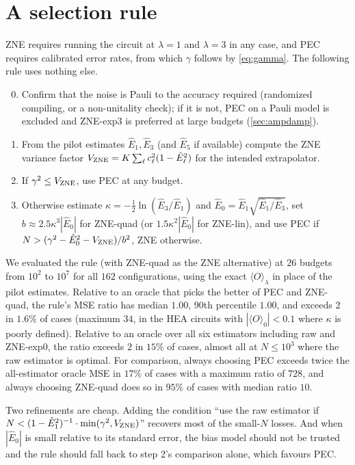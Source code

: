 \documentclass[aps,pra,reprint,amsmath,amssymb,nofootinbib,superscriptaddress]{revtex4-2}
\theoremstyle{remark}
\begin{document}
\section{A selection rule}
\label{sec:rule}

ZNE requires running the circuit at $\lambda=1$ and $\lambda=3$ in any case, and PEC requires calibrated error rates, from which $\gamma$ follows by \cref{eq:gamma}. The following rule uses nothing else.

\begin{enumerate}
\setcounter{enumi}{-1}
\item Confirm that the noise is Pauli to the accuracy required (randomized compiling, or a non-unitality check); if it is not, PEC on a Pauli model is excluded and ZNE-exp3 is preferred at large budgets (\cref{sec:ampdamp}).
\item From the pilot estimates $\hat E_1,\hat E_3$ (and $\hat E_5$ if available) compute the ZNE variance factor $V_{\rm ZNE}=K\sum_\ell c_\ell^2(1-\hat E_\ell^2)$ for the intended extrapolator.
\item If $\gamma^2\le V_{\rm ZNE}$, use PEC at any budget.
\item Otherwise estimate $\kappa=-\tfrac12\ln(\hat E_3/\hat E_1)$ and $\hat E_0=\hat E_1\sqrt{\hat E_1/\hat E_3}$, set $b\approx2.5\kappa^3|\hat E_0|$ for ZNE-quad (or $1.5\kappa^2|\hat E_0|$ for ZNE-lin), and use PEC if $N>(\gamma^2-\hat E_0^2-V_{\rm ZNE})/b^2$, ZNE otherwise.
\end{enumerate}

We evaluated the rule (with ZNE-quad as the ZNE alternative) at $26$ budgets from $10^2$ to $10^7$ for all $162$ configurations, using the exact $\langle O\rangle_\lambda$ in place of the pilot estimates. Relative to an oracle that picks the better of PEC and ZNE-quad, the rule's MSE ratio has median $1.00$, 90th percentile $1.00$, and exceeds $2$ in $1.6\%$ of cases (maximum $34$, in the HEA circuits with $|\langle O\rangle_0|<0.1$ where $\kappa$ is poorly defined). Relative to an oracle over all six estimators including raw and ZNE-exp0, the ratio exceeds $2$ in $15\%$ of cases, almost all at $N\le10^3$ where the raw estimator is optimal. For comparison, always choosing PEC exceeds twice the all-estimator oracle MSE in $17\%$ of cases with a maximum ratio of $728$, and always choosing ZNE-quad does so in $95\%$ of cases with median ratio $10$.

Two refinements are cheap. Adding the condition ``use the raw estimator if $N<(1-\hat E_1^2)^{-1}\cdot\min(\gamma^2,V_{\rm ZNE})$'' recovers most of the small-$N$ losses. And when $|\hat E_0|$ is small relative to its standard error, the bias model should not be trusted and the rule should fall back to step 2's comparison alone, which favours PEC.
\end{document}
